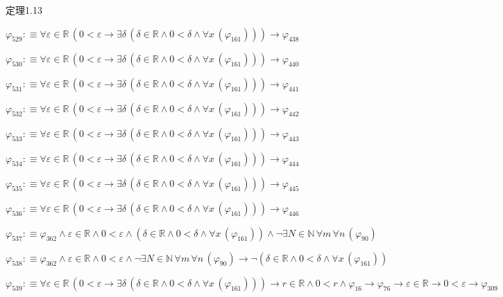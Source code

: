 \begin{fullproof}{定理1.13}
\begin{abbrevlist}
\item $\varphi_{529} :\equiv \forall \varepsilon \in \mathbb{R}\,(0 < \varepsilon \to \exists \delta\,(\delta \in \mathbb{R} \land 0 < \delta \land \forall x\,(\varphi_{161}))) \to \varphi_{438}$
\item $\varphi_{530} :\equiv \forall \varepsilon \in \mathbb{R}\,(0 < \varepsilon \to \exists \delta\,(\delta \in \mathbb{R} \land 0 < \delta \land \forall x\,(\varphi_{161}))) \to \varphi_{440}$
\item $\varphi_{531} :\equiv \forall \varepsilon \in \mathbb{R}\,(0 < \varepsilon \to \exists \delta\,(\delta \in \mathbb{R} \land 0 < \delta \land \forall x\,(\varphi_{161}))) \to \varphi_{441}$
\item $\varphi_{532} :\equiv \forall \varepsilon \in \mathbb{R}\,(0 < \varepsilon \to \exists \delta\,(\delta \in \mathbb{R} \land 0 < \delta \land \forall x\,(\varphi_{161}))) \to \varphi_{442}$
\item $\varphi_{533} :\equiv \forall \varepsilon \in \mathbb{R}\,(0 < \varepsilon \to \exists \delta\,(\delta \in \mathbb{R} \land 0 < \delta \land \forall x\,(\varphi_{161}))) \to \varphi_{443}$
\item $\varphi_{534} :\equiv \forall \varepsilon \in \mathbb{R}\,(0 < \varepsilon \to \exists \delta\,(\delta \in \mathbb{R} \land 0 < \delta \land \forall x\,(\varphi_{161}))) \to \varphi_{444}$
\item $\varphi_{535} :\equiv \forall \varepsilon \in \mathbb{R}\,(0 < \varepsilon \to \exists \delta\,(\delta \in \mathbb{R} \land 0 < \delta \land \forall x\,(\varphi_{161}))) \to \varphi_{445}$
\item $\varphi_{536} :\equiv \forall \varepsilon \in \mathbb{R}\,(0 < \varepsilon \to \exists \delta\,(\delta \in \mathbb{R} \land 0 < \delta \land \forall x\,(\varphi_{161}))) \to \varphi_{446}$
\item $\varphi_{537} :\equiv \varphi_{362} \land \varepsilon \in \mathbb{R} \land 0 < \varepsilon \land (\delta \in \mathbb{R} \land 0 < \delta \land \forall x\,(\varphi_{161})) \land \neg \exists N \in \mathbb{N}\,\forall m\,\forall n\,(\varphi_{90})$
\item $\varphi_{538} :\equiv \varphi_{362} \land \varepsilon \in \mathbb{R} \land 0 < \varepsilon \land \neg \exists N \in \mathbb{N}\,\forall m\,\forall n\,(\varphi_{90}) \to \neg (\delta \in \mathbb{R} \land 0 < \delta \land \forall x\,(\varphi_{161}))$
\item $\varphi_{539} :\equiv \forall \varepsilon \in \mathbb{R}\,(0 < \varepsilon \to \exists \delta\,(\delta \in \mathbb{R} \land 0 < \delta \land \forall x\,(\varphi_{161}))) \to r \in \mathbb{R} \land 0 < r \land \varphi_{16} \to \varphi_{76} \to \varepsilon \in \mathbb{R} \to 0 < \varepsilon \to \varphi_{309}$

\end{abbrevlist}
\end{fullproof}
